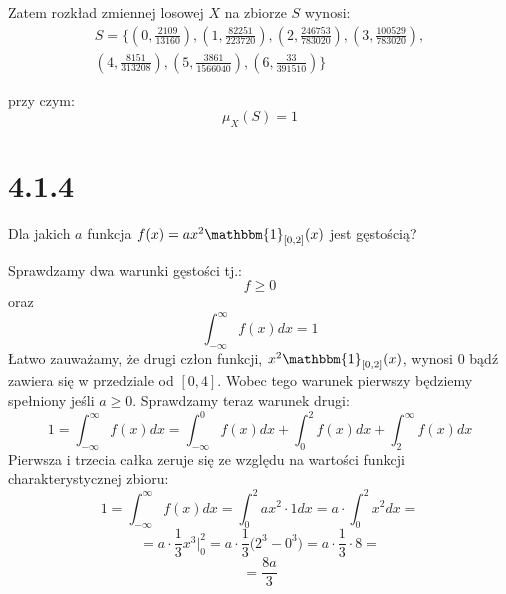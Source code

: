 \documentclass{article}
\begin{document}
Zatem rozkład zmiennej losowej \(X\) na zbiorze \(S\) wynosi:
\begin{align*} 
    S = \Big\{(0, \frac{2109}{13160}), (1, \frac{82251}{223720}), (2, \frac{246753}{783020}), (3, \frac{100529}{783020}), \\
             (4, \frac{8151}{313208}), (5, \frac{3861}{1566040}), (6, \frac{33}{391510})\Big\}
\end{align*}

przy czym:
\begin{equation*}
    \mu_{X}(S) = 1
\end{equation*}

\section*{4.1.4}

\begin{center}
    Dla jakich \(a\) funkcja \(f(x) = ax^{2}\mathbbm{1}_{[0,2]}(x)\) jest gęstością?
\end{center}

Sprawdzamy dwa warunki gęstości tj.:
\begin{equation*}
    f \geq 0
\end{equation*}
oraz
\begin{equation*}
    \int_{-\infty}^{\infty} f(x)dx = 1
\end{equation*}
Łatwo zauważamy, że drugi człon funkcji, \(x^{2}\mathbbm{1}_{[0,2]}(x)\), wynosi \(0\) bądź zawiera się w przedziale od \([0, 4]\).
Wobec tego warunek pierwszy będziemy spełniony jeśli \(a \geq 0\). Sprawdzamy teraz warunek drugi:
\begin{equation*}
    1 = \int_{-\infty}^{\infty} f(x)dx = \int_{-\infty}^{0} f(x)dx + \int_{0}^{2} f(x)dx + \int_{2}^{\infty} f(x)dx
\end{equation*}
Pierwsza i trzecia całka zeruje się ze względu na wartości funkcji charakterystycznej zbioru:
\begin{equation*}
    1 = \int_{-\infty}^{\infty} f(x)dx = \int_{0}^{2} ax^{2} \cdot 1 dx = a \cdot \int_{0}^{2} x^{2} dx = 
\end{equation*}
\begin{equation*}
    = a \cdot \frac{1}{3}x^{3} \Bigg\rvert_{0}^{2} = a \cdot \frac{1}{3}\Bigg(2^{3} - 0^{3}\Bigg) = a \cdot \frac{1}{3} \cdot 8 =
\end{equation*}
\begin{equation*}
    = \frac{8a}{3}
\end{equation*}
\end{document}
